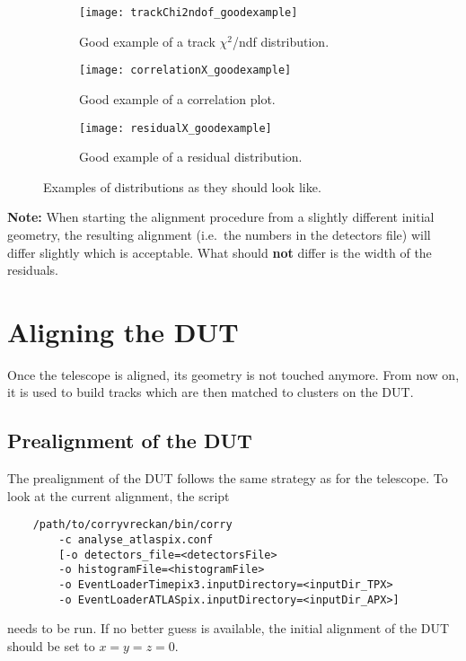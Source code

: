 \begin{figure}
    \centering
    \begin{subfigure}[t]{0.66\textwidth}
        \texttt{[image: trackChi2ndof\_goodexample]}
        \caption{Good example of a track $\chi^2$/ndf distribution.}
        \label{fig:trackChi2}
    \end{subfigure}
    \begin{subfigure}[t]{0.66\textwidth}
        \texttt{[image: correlationX\_goodexample]}
        \caption{Good example of a correlation plot.}
        \label{fig:correlationX}
    \end{subfigure}
    \begin{subfigure}[t]{0.66\textwidth}
        \texttt{[image: residualX\_goodexample]}
        \caption{Good example of a residual distribution.}
        \label{fig:residualX}
    \end{subfigure}
    \caption{Examples of distributions as they should look like.}
    \label{fig:exampleAlignment}
\end{figure}

\textbf{Note:} When starting the alignment procedure from a slightly different initial geometry, the resulting alignment (i.e.~the numbers in the detectors file) will differ slightly which is acceptable. What should \textbf{not} differ is the width of the residuals.

\section{Aligning the DUT}
\label{sec:align_dut}
Once the telescope is aligned, its geometry is not touched anymore. From now on, it is used to build tracks which are then matched to clusters on the DUT.

\subsection*{Prealignment of the DUT}
The prealignment of the DUT follows the same strategy as for the telescope. To look at the current alignment, the script
\begin{verbatim}
    /path/to/corryvreckan/bin/corry 
    	-c analyse_atlaspix.conf 
    	[-o detectors_file=<detectorsFile> 
    	-o histogramFile=<histogramFile> 
    	-o EventLoaderTimepix3.inputDirectory=<inputDir_TPX>
    	-o EventLoaderATLASpix.inputDirectory=<inputDir_APX>]
\end{verbatim}
needs to be run.
If no better guess is available, the initial alignment of the DUT should be set to $x=y=z=0$.

